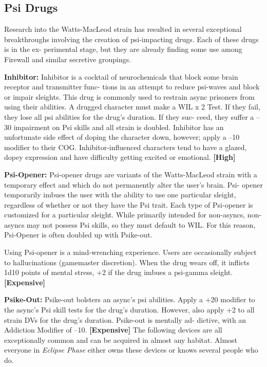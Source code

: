 \subsection{Psi Drugs}

Research into the Watts-MacLeod strain has resulted in 
several exceptional breakthroughs involving the creation 
of psi-impacting drugs. Each of these drugs is in the ex-
perimental stage, but they are already finding some use 
among Firewall and similar secretive groupings.

\textbf{Inhibitor:} Inhibitor is a cocktail of neurochemicals 
that block some brain receptor and transmitter func-
tions in an attempt to reduce psi-waves and block or 
impair sleights. This drug is commonly used to restrain 
async prisoners from using their abilities. A drugged 
character must make a WIL x 2 Test. If they fail, they 
lose all psi abilities for the drug's duration. If they suc-
ceed, they suffer a –30 impairment on Psi skills and 
all strain is doubled. Inhibitor has an unfortunate side 
effect of doping the character down, however; apply 
a –10 modifier to their COG. Inhibitor-influenced 
characters tend to have a glazed, dopey expression and 
have difficulty getting excited or emotional. \textbf{[High]}

\textbf{Psi-Opener:} Psi-opener drugs are variants of the 
Watts-MacLeod strain with a temporary effect and 
which do not permanently alter the user's brain. Psi-
opener temporarily imbues the user with the ability 
to use one particular sleight, regardless of whether or 
not they have the Psi trait. Each type of Psi-opener is 
customized for a particular sleight. While primarily 
intended for non-asyncs, non-asyncs may not possess 
Psi skills, so they must default to WIL. For this reason, 
Psi-Opener is often doubled up with Psike-out.

Using Psi-opener is a mind-wrenching experience. 
Users are occasionally subject to hallucinations 
(gamemaster discretion). When the drug wears off, it 
inflicts 1d10 points of mental stress, +2 if the drug 
imbues a psi-gamma sleight. \textbf{[Expensive]}

\textbf{Psike-Out:} Psike-out bolsters an async's psi abilities. 
Apply a +20 modifier to the async's Psi skill tests for the 
drug's duration. However, also apply +2 to all strain 
DVs for the drug's duration. Psike-out is mentally ad-
dictive, with an Addiction Modifier of –10. \textbf{[Expensive]}
The following devices are all exceptionally common 
and can be acquired in almost any habitat. Almost 
everyone in \textit{Eclipse Phase} either owns these devices or 
knows several people who do.

